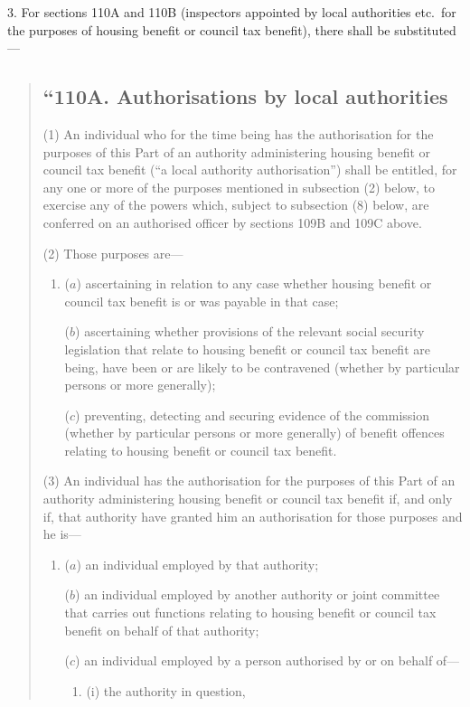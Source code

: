 \documentclass[12pt,a4paper]{article}
\begin{document}
3. For sections 110A and 110B (inspectors appointed by local authorities etc.\ for the purposes of housing benefit or council tax benefit), there shall be substituted—
\begin{quotation}
\subsection*{“110A. Authorisations by local authorities}

(1) An individual who for the time being has the authorisation for the purposes of this Part of an authority administering housing benefit or council tax benefit (“a local authority authorisation”) shall be entitled, for any one or more of the purposes mentioned in subsection (2)  below, to exercise any of the powers which, subject to subsection (8)  below, are conferred on an authorised officer by sections 109B and 109C above.

(2) Those purposes are—
\begin{enumerate}\item[]
($a$) ascertaining in relation to any case whether housing benefit or council tax benefit is or was payable in that case;

($b$) ascertaining whether provisions of the relevant social security legislation that relate to housing benefit or council tax benefit are being, have been or are likely to be contravened (whether by particular persons or more generally);

($c$) preventing, detecting and securing evidence of the commission (whether by particular persons or more generally) of benefit offences relating to housing benefit or council tax benefit.
\end{enumerate}

(3) An individual has the authorisation for the purposes of this Part of an authority administering housing benefit or council tax benefit if, and only if, that authority have granted him an authorisation for those purposes and he is—
\begin{enumerate}\item[]
($a$) an individual employed by that authority;

($b$) an individual employed by another authority or joint committee that carries out functions relating to housing benefit or council tax benefit on behalf of that authority;

($c$) an individual employed by a person authorised by or on behalf of—
\begin{enumerate}\item[]
(i) the authority in question,


\end{enumerate}
\end{enumerate}
\end{quotation}
\end{document}
